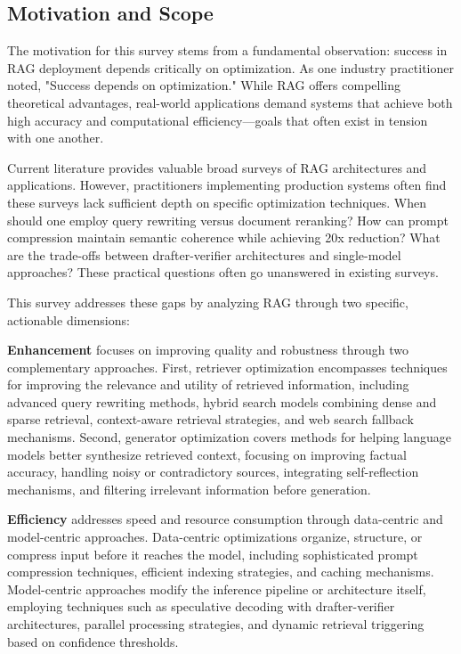 \documentclass[11pt]{article}
\begin{document}
\subsection{Motivation and Scope}

The motivation for this survey stems from a fundamental observation: success in RAG deployment depends critically on optimization. As one industry practitioner noted, "Success depends on optimization." While RAG offers compelling theoretical advantages, real-world applications demand systems that achieve both high accuracy and computational efficiency—goals that often exist in tension with one another.

Current literature provides valuable broad surveys of RAG architectures and applications. However, practitioners implementing production systems often find these surveys lack sufficient depth on specific optimization techniques. When should one employ query rewriting versus document reranking? How can prompt compression maintain semantic coherence while achieving 20x reduction? What are the trade-offs between drafter-verifier architectures and single-model approaches? These practical questions often go unanswered in existing surveys.

This survey addresses these gaps by analyzing RAG through two specific, actionable dimensions:

\textbf{Enhancement} focuses on improving quality and robustness through two complementary approaches. First, retriever optimization encompasses techniques for improving the relevance and utility of retrieved information, including advanced query rewriting methods, hybrid search models combining dense and sparse retrieval, context-aware retrieval strategies, and web search fallback mechanisms. Second, generator optimization covers methods for helping language models better synthesize retrieved context, focusing on improving factual accuracy, handling noisy or contradictory sources, integrating self-reflection mechanisms, and filtering irrelevant information before generation.

\textbf{Efficiency} addresses speed and resource consumption through data-centric and model-centric approaches. Data-centric optimizations organize, structure, or compress input before it reaches the model, including sophisticated prompt compression techniques, efficient indexing strategies, and caching mechanisms. Model-centric approaches modify the inference pipeline or architecture itself, employing techniques such as speculative decoding with drafter-verifier architectures, parallel processing strategies, and dynamic retrieval triggering based on confidence thresholds.
\end{document}
